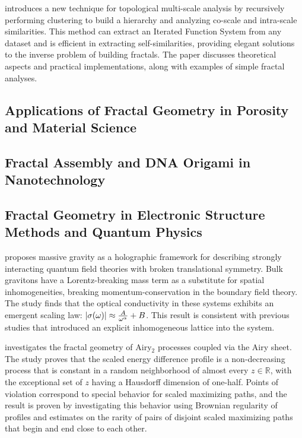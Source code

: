 \documentclass{article}
\begin{document}
\cite{Leleu2010RecursiveSH} introduces a new technique for topological multi-scale analysis by recursively performing clustering to build a hierarchy and analyzing co-scale and intra-scale similarities. This method can extract an Iterated Function System from any dataset and is efficient in extracting self-similarities, providing elegant solutions to the inverse problem of building fractals. The paper discusses theoretical aspects and practical implementations, along with examples of simple fractal analyses.

\subsection{Applications of Fractal Geometry in Porosity and Material Science}

\subsection{Fractal Assembly and DNA Origami in Nanotechnology}

\subsection{Fractal Geometry in Electronic Structure Methods and Quantum Physics}

\cite{Vegh2013HolographyWT} proposes massive gravity as a holographic framework for describing strongly interacting quantum field theories with broken translational symmetry. Bulk gravitons have a Lorentz-breaking mass term as a substitute for spatial inhomogeneities, breaking momentum-conservation in the boundary field theory. The study finds that the optical conductivity in these systems exhibits an emergent scaling law: $|\sigma(\omega)| \approx {A \over \omega^{\alpha}} + B$. This result is consistent with previous studies that introduced an explicit inhomogeneous lattice into the system.

\cite{Basu2019FractalGO} investigates the fractal geometry of Airy$_{2}$ processes coupled via the Airy sheet. The study proves that the scaled energy difference profile is a non-decreasing process that is constant in a random neighborhood of almost every $z \in \mathbb{R}$, with the exceptional set of $z$ having a Hausdorff dimension of one-half. Points of violation correspond to special behavior for scaled maximizing paths, and the result is proven by investigating this behavior using Brownian regularity of profiles and estimates on the rarity of pairs of disjoint scaled maximizing paths that begin and end close to each other.
\end{document}
